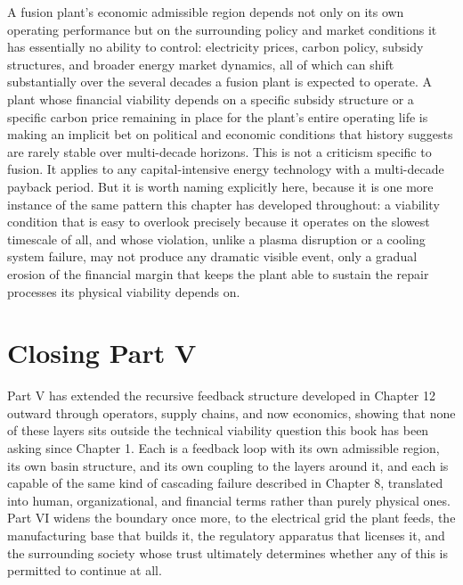 A fusion plant's economic admissible region depends not only on its own operating performance but on the surrounding policy and market conditions it has essentially no ability to control: electricity prices, carbon policy, subsidy structures, and broader energy market dynamics, all of which can shift substantially over the several decades a fusion plant is expected to operate. A plant whose financial viability depends on a specific subsidy structure or a specific carbon price remaining in place for the plant's entire operating life is making an implicit bet on political and economic conditions that history suggests are rarely stable over multi-decade horizons. This is not a criticism specific to fusion. It applies to any capital-intensive energy technology with a multi-decade payback period. But it is worth naming explicitly here, because it is one more instance of the same pattern this chapter has developed throughout: a viability condition that is easy to overlook precisely because it operates on the slowest timescale of all, and whose violation, unlike a plasma disruption or a cooling system failure, may not produce any dramatic visible event, only a gradual erosion of the financial margin that keeps the plant able to sustain the repair processes its physical viability depends on.

\section{Closing Part V}

Part V has extended the recursive feedback structure developed in Chapter 12 outward through operators, supply chains, and now economics, showing that none of these layers sits outside the technical viability question this book has been asking since Chapter 1. Each is a feedback loop with its own admissible region, its own basin structure, and its own coupling to the layers around it, and each is capable of the same kind of cascading failure described in Chapter 8, translated into human, organizational, and financial terms rather than purely physical ones. Part VI widens the boundary once more, to the electrical grid the plant feeds, the manufacturing base that builds it, the regulatory apparatus that licenses it, and the surrounding society whose trust ultimately determines whether any of this is permitted to continue at all.
